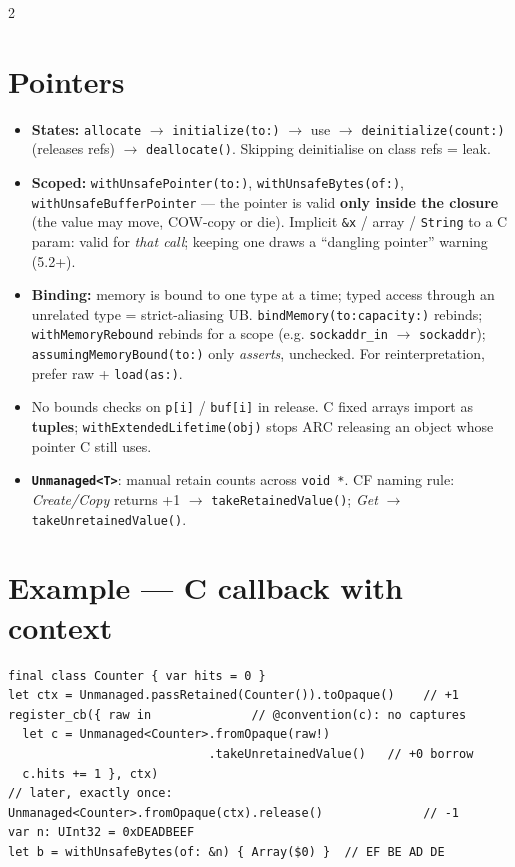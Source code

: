 \documentclass[8pt]{extarticle}
\begin{document}
\begin{multicols}{2}
\raggedright

\section{Pointers}
\begin{itemize}
  \item \textbf{States:} \texttt{allocate} $\to$ \texttt{initialize(to:)} $\to$
        use $\to$ \texttt{deinitialize(count:)} (releases refs) $\to$
        \texttt{deallocate()}. Skipping deinitialise on class refs = leak.
  \item \textbf{Scoped:} \texttt{withUnsafePointer(to:)},
        \texttt{withUnsafeBytes(of:)}, \texttt{withUnsafeBufferPointer} — the
        pointer is valid \textbf{only inside the closure} (the value may move,
        COW-copy or die). Implicit \texttt{\&x} / array / \texttt{String} to a
        C param: valid for \emph{that call}; keeping one draws a
        ``dangling pointer'' warning (5.2+).
  \item \textbf{Binding:} memory is bound to one type at a time; typed
        access through an unrelated type = strict-aliasing UB.
        \texttt{bindMemory(to:capacity:)} rebinds; \texttt{withMemoryRebound}
        rebinds for a scope (e.g. \texttt{sockaddr\_in} $\to$
        \texttt{sockaddr}); \texttt{assumingMemoryBound(to:)} only
        \emph{asserts}, unchecked. For reinterpretation, prefer raw +
        \texttt{load(as:)}.
  \item No bounds checks on \texttt{p[i]} / \texttt{buf[i]} in release.
        C fixed arrays import as \textbf{tuples}; \texttt{withExtendedLifetime(obj)}
        stops ARC releasing an object whose pointer C still uses.
  \item \textbf{\texttt{Unmanaged<T>}}: manual retain counts across
        \texttt{void *}. CF naming rule: \emph{Create/Copy} returns +1
        $\to$ \texttt{takeRetainedValue()}; \emph{Get} $\to$
        \texttt{takeUnretainedValue()}.
\end{itemize}

\section{Example — C callback with context}
\begin{lstlisting}[language=SwiftSheet]
final class Counter { var hits = 0 }
let ctx = Unmanaged.passRetained(Counter()).toOpaque()    // +1
register_cb({ raw in              // @convention(c): no captures
  let c = Unmanaged<Counter>.fromOpaque(raw!)
                            .takeUnretainedValue()   // +0 borrow
  c.hits += 1 }, ctx)
// later, exactly once:
Unmanaged<Counter>.fromOpaque(ctx).release()              // -1
var n: UInt32 = 0xDEADBEEF
let b = withUnsafeBytes(of: &n) { Array($0) }  // EF BE AD DE
\end{lstlisting}


\end{multicols}
\end{document}
